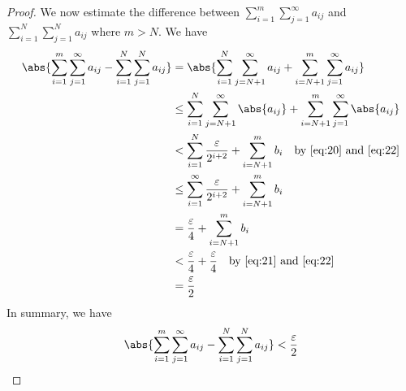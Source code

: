 \documentclass[thmcnt=section, 12pt]{elegantbook}
\begin{document}
\begin{proof}
    \par We now estimate the difference between $\sum_{i=1}^m \sum_{j=1}^\infty a_{ij}$ and $\sum_{i=1}^N \sum_{j=1}^N a_{ij}$ where $m > N$. We have 
    \begin{align*}
        \abs{
            \sum_{i=1}^m \sum_{j=1}^\infty a_{ij}
            - \sum_{i=1}^N \sum_{j=1}^N a_{ij}
        } &= \abs{
            \sum_{i=1}^N \sum_{j=N+1}^\infty a_{ij}
            + \sum_{i=N+1}^m \sum_{j=1}^\infty a_{ij}
        } \\ 
        &\leq \sum_{i=1}^N \sum_{j=N+1}^\infty \abs{a_{ij}}
        + \sum_{i=N+1}^m \sum_{j=1}^\infty \abs{a_{ij}} \\ 
        &< \sum_{i=1}^N \frac{\varepsilon}{2^{i+2}}
        + \sum_{i=N+1}^m b_i
        \quad \text{by \eqref{eq:20} and \eqref{eq:22}} \\ 
        &\leq \sum_{i=1}^\infty \frac{\varepsilon}{2^{i+2}}
        + \sum_{i=N+1}^m b_i \\ 
        &= \frac{\varepsilon}{4} + \sum_{i=N+1}^m b_i \\ 
        &< \frac{\varepsilon}{4} + \frac{\varepsilon}{4} 
        \quad \text{by \eqref{eq:21} and \eqref{eq:22}} \\ 
        &= \frac{\varepsilon}{2}
    \end{align*}
    In summary, we have 
    \begin{align}
        \abs{
            \sum_{i=1}^m \sum_{j=1}^\infty a_{ij}
            - \sum_{i=1}^N \sum_{j=1}^N a_{ij}
        } < \frac{\varepsilon}{2}
        \label{eq:23}
    \end{align}


\end{proof}
\end{document}

